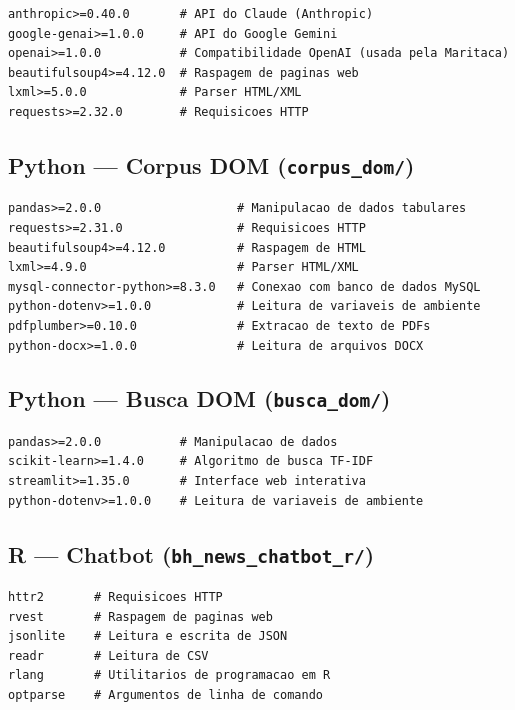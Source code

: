 \documentclass[12pt,a4paper]{article}
\begin{document}
\begin{lstlisting}
anthropic>=0.40.0       # API do Claude (Anthropic)
google-genai>=1.0.0     # API do Google Gemini
openai>=1.0.0           # Compatibilidade OpenAI (usada pela Maritaca)
beautifulsoup4>=4.12.0  # Raspagem de paginas web
lxml>=5.0.0             # Parser HTML/XML
requests>=2.32.0        # Requisicoes HTTP
\end{lstlisting}

\subsection{Python --- Corpus DOM (\texttt{corpus\_dom/})}

\begin{lstlisting}
pandas>=2.0.0                   # Manipulacao de dados tabulares
requests>=2.31.0                # Requisicoes HTTP
beautifulsoup4>=4.12.0          # Raspagem de HTML
lxml>=4.9.0                     # Parser HTML/XML
mysql-connector-python>=8.3.0   # Conexao com banco de dados MySQL
python-dotenv>=1.0.0            # Leitura de variaveis de ambiente
pdfplumber>=0.10.0              # Extracao de texto de PDFs
python-docx>=1.0.0              # Leitura de arquivos DOCX
\end{lstlisting}

\subsection{Python --- Busca DOM (\texttt{busca\_dom/})}

\begin{lstlisting}
pandas>=2.0.0           # Manipulacao de dados
scikit-learn>=1.4.0     # Algoritmo de busca TF-IDF
streamlit>=1.35.0       # Interface web interativa
python-dotenv>=1.0.0    # Leitura de variaveis de ambiente
\end{lstlisting}

\subsection{R --- Chatbot (\texttt{bh\_news\_chatbot\_r/})}

\begin{lstlisting}
httr2       # Requisicoes HTTP
rvest       # Raspagem de paginas web
jsonlite    # Leitura e escrita de JSON
readr       # Leitura de CSV
rlang       # Utilitarios de programacao em R
optparse    # Argumentos de linha de comando
\end{lstlisting}
\end{document}
